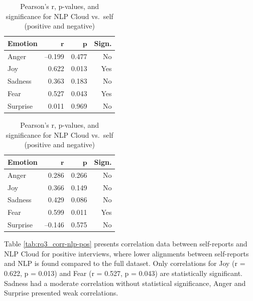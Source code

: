 \begin{table}[H]
    \centering
  
    \begin{subtable}{0.45\textwidth}
      \centering
      \caption{\textbf{Positive Recordings (NLP)}}\label{tab:rq3_corr-nlp-pos}
      \begin{tabular}{l r r r}
        \toprule
        \textbf{Emotion} & \(\mathbf{r}\) & \(\mathbf{p}\) & \textbf{Sign.} \\
        \midrule
        Anger    & –0.199 & 0.477 & No  \\
        Joy      &  0.622 & 0.013 & Yes \\
        Sadness  &  0.363 & 0.183 & No  \\
        Fear     &  0.527 & 0.043 & Yes \\
        Surprise &  0.011 & 0.969 & No  \\
        \bottomrule
      \end{tabular}
    \end{subtable}\hfill
    \begin{subtable}{0.45\textwidth}
      \centering
      \caption{\textbf{Negative Recordings (NLP)}}\label{tab:rq3_corr-nlp-neg}
      \begin{tabular}{l r r r}
        \toprule
        \textbf{Emotion} & \(\mathbf{r}\) & \(\mathbf{p}\) & \textbf{Sign.} \\
        \midrule
        Anger    &  0.286 & 0.266 & No  \\
        Joy      &  0.366 & 0.149 & No  \\
        Sadness  &  0.429 & 0.086 & No  \\
        Fear     &  0.599 & 0.011 & Yes \\
        Surprise & –0.146 & 0.575 & No  \\
        \bottomrule
      \end{tabular}
    \end{subtable}
  
    \caption{Pearson’s r, p-values, and significance for NLP Cloud vs.\ self (positive and negative)}
    \label{tab:rq3_corr-nlp-pos-neg}
  \end{table}
  
  Table \ref{tab:rq3_corr-nlp-pos} presents correlation data between self-reports and NLP Cloud for positive interviews, where lower alignments between self-reports and NLP is found compared to the full dataset. 
  Only correlations for Joy (r = 0.622, p = 0.013) and Fear (r = 0.527, p = 0.043) are statistically significant. Sadness had a moderate correlation without statistical significance, Anger and Surprise presented weak correlations. 
  
